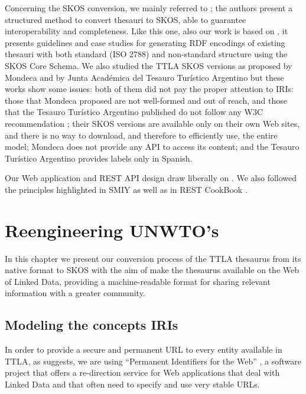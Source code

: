 \documentclass[runningheads,a4paper]{llncs}
\begin{document}
Concerning the SKOS conversion, we mainly referred to  \cite{_Ref364511215}; the authors present a structured method to convert thesauri to SKOS, able to guarantee interoperability and completeness. Like this one, also our work is based on  \cite{_Ref364511258}, it presents guidelines and case studies for generating RDF encodings of existing thesauri with both standard (ISO 2788) and non-standard structure using the SKOS Core Schema. We also studied the TTLA SKOS versions as proposed by Mondeca  \cite{_Ref364511313} and by Junta Acad\'emica del Tesauro Tur\'istico Argentino  \cite{_Ref364511335} but these works show some issues: both of them did not pay the proper attention to IRIs: those that Mondeca proposed are not well-formed and out of reach, and those that the Tesauro Tur\'istico Argentino published do not follow any W3C recommendation  \cite{_Ref364511363}; their SKOS versions are available only on their own Web sites, and there is no way to download, and therefore to efficiently use, the entire model; Mondeca does not provide any API to access its content; and the Tesauro Tur\'istico Argentino provides labels only in Spanish.

Our Web application and REST API design draw liberally on  \cite{_Ref364511386}. We also followed the principles highlighted in SMIY  \cite{_Ref364511415} as well as in REST CookBook  \cite{_Ref364511429}.

\section{Reengineering UNWTO's}

In this chapter we present our conversion process of the TTLA thesaurus from its native format to SKOS with the aim of make the thesaurus available on the Web of Linked Data, providing a machine-readable format for sharing relevant information with a greater community.

\subsection{Modeling the concepts IRIs}

In order to provide a secure and permanent URL to every entity available in TTLA, as  \cite{_Ref364511466} suggests, we are using ``Permanent Identifiers for the Web'' \cite{_Ref364511490}, a software project that offers a re-direction service for Web applications that deal with Linked Data and that often need to specify and use very stable URLs. 
\end{document}
